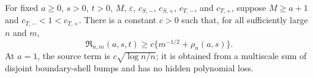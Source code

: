 For fixed \(a\ge0\), \(s>0\), \(t>0\), \(M\), \(\varepsilon\), \(c_{S,-}\), \(c_{S,+}\), \(c_{T,-}\), and \(c_{T,+}\), suppose \(M\ge a+1\) and \(c_{T,-}<1<c_{T,+}\). There is a constant \(c>0\) such that, for all sufficiently large \(n\) and \(m\),
\[
\mathfrak R_{n,m}(a,s,t)\ge c\{m^{-1/2}+\rho_n(a,s)\}.
\]
At \(a=1\), the source term is \(c\sqrt{\log n/n}\); it is obtained from a multiscale sum of disjoint boundary-shell bumps and has no hidden polynomial loss.